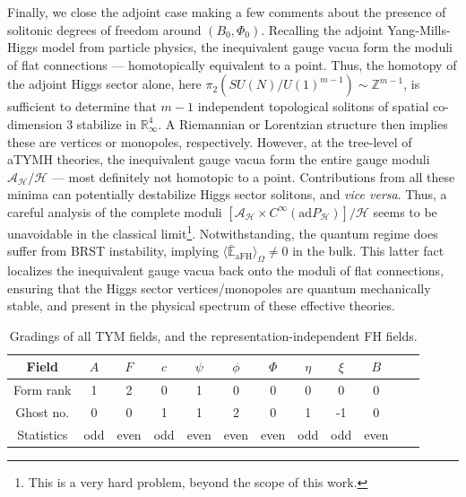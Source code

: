 \documentclass[../main.tex]{subfiles}
\begin{document}
Finally, we close the adjoint case making a few comments about the presence of solitonic degrees of freedom around $(B_0, \Phi_0)$. Recalling the adjoint Yang-Mills-Higgs model from particle physics, the inequivalent gauge vacua form the moduli of flat connections --- homotopically equivalent to a point. Thus, the homotopy of the adjoint Higgs sector alone, here $\pi_2 (SU(N)/{U(1)}^{m-1}) \sim \mathbb{Z}^{m-1}$, is sufficient to determine that $m-1$ independent topological solitons of spatial co-dimension 3 stabilize in $\mathbb{R}^4_{\infty}$. A Riemannian or Lorentzian structure then implies these are vertices or monopoles, respectively. However, at the tree-level of aTYMH theories, the inequivalent gauge vacua form the entire gauge moduli $\mathcal{A}_\mathcal{H}/\mathcal{H}$ --- most definitely not homotopic to a point. Contributions from all these minima can potentially destabilize Higgs sector solitons, and \textit{vice versa}. Thus, a careful analysis of the complete moduli $[\mathcal{A}_{\mathcal{H}} \times C^{\infty} (\mathrm{ad}P_{\mathcal{H}})] / \mathcal{H} $ seems to be unavoidable in the classical limit\footnote{This is a very hard problem, beyond the scope of this work.}. Notwithstanding, the quantum regime does suffer from BRST instability, implying $\langle \bar{\mathbb{E}}_{\text{aFH}} \rangle_{\Omega} \neq 0 $ in the bulk. This latter fact localizes the inequivalent gauge vacua back onto the moduli of flat connections, ensuring that the Higgs sector vertices/monopoles are quantum mechanically stable, and present in the physical spectrum of these effective theories.

\begin{table}[htpb]
  \caption{Gradings of all TYM fields, and the representation-independent FH fields.}%
  \label{tab:gradings} \begin{tabular}{cccccccccccc}\toprule
    Field      & $A$ & $F$  & $c$ & $\psi$ & $\phi$ & $\Phi$ & $\eta$ & $\xi$ & $B$  \\
    \midrule
    Form rank  & 1   & 2    & 0   & 1      & 0      & 0      & 0      & 0     & 0    \\
    Ghost no.  & 0   & 0    & 1   & 1      & 2      & 0      & 1      & -1    & 0    \\
    Statistics & odd & even & odd & even   & even   & even   & odd    & odd   & even \\
    \bottomrule
  \end{tabular}
\end{table}
\end{document}
